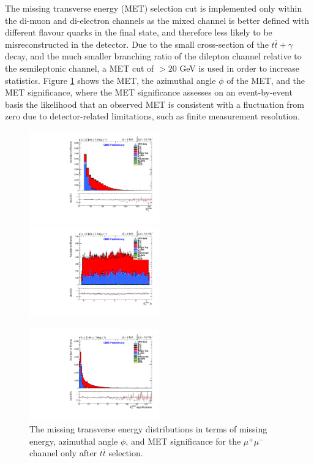 The missing transverse energy (MET) selection cut is implemented only within the di-muon and di-electron channels as the mixed channel is better defined with different flavour quarks in the final state, and therefore less likely to be misreconstructed in the detector. Due to the small cross-section of the $t\bar{t}+\gamma$ decay, and the much smaller branching ratio of the dilepton channel relative to the semileptonic channel, a MET cut of $>20$ GeV is used in order to increase statistics. Figure \ref{fig-METplots} shows the MET, the azimuthal angle $\phi$ of the MET, and the MET significance, where the MET significance assesses on an event-by-event basis the likelihood that an observed MET is consistent with a fluctuation from zero due to detector-related limitations, such as finite measurement resolution. 

\begin{figure}
\includegraphics[width=0.5\textwidth]{Plots/ControlPlots/TTbarDiLeptonAnalysis/MuMu/MET/patType1CorrectedPFMet/MET_splitTTbar_ratio.pdf}
\includegraphics[width=0.5\textwidth]{Plots/ControlPlots/TTbarDiLeptonAnalysis/MuMu/MET/patType1CorrectedPFMet/MET_phi_splitTTbar_ratio.pdf}\\
\begin{center}
\includegraphics[width=0.5\textwidth]{Plots/ControlPlots/TTbarDiLeptonAnalysis/EE/MET/patType1CorrectedPFMet/METsignificance_splitTTbar_ratio.pdf}
\end{center}
\caption{The missing transverse energy distributions in terms of missing energy, azimuthal angle $\phi$, and MET significance for the $\mu^{+}\mu^{-}$ channel only after $t\bar{t}$ selection.}
\label{fig-METplots}
\end{figure}

